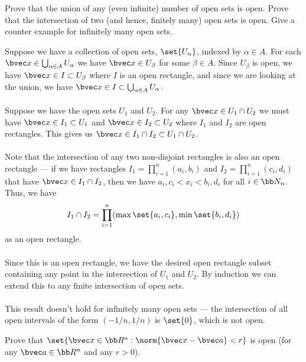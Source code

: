 \documentclass[12pt, letterpaper]{hmcpset}
\begin{document}
\pagebreak

\begin{problem}[14]
	Prove that the union of any (even infinite) number of open sets is open. Prove that the intersection of two (and hence, finitely many) open sets is open. Give a counter example for infinitely many open sets.
\end{problem}

\begin{solution}
	Suppose we have a collection of open sets, $\set{U_{\alpha}}$, indexed by $\alpha \in A$. For each $\bvec x \in \bigcup_{\alpha \in A} U_\alpha$ we have $\bvec x \in U_{\beta}$ for some $\beta \in A$. Since $U_\beta$ is open, we have $\bvec x \in I \subset U_\beta$ where $I$ is an open rectangle, and since we are looking at the union, we have $\bvec x \in I \subset \bigcup_{\alpha \in A} U_\alpha$. \\\\
	Suppose we have the open sets $U_1$ and $U_2$. For any $\bvec x \in U_1 \cap U_2$ we must have $\bvec x \in I_1 \subset U_1$ and $\bvec x \in I_2 \subset U_2$ where $I_1$ and $I_2$ are open rectangles. This gives us $\bvec x \in I_1 \cap I_2 \subset U_1 \cap U_2$. \\\\
	Note that the intersection of any two non-disjoint rectangles is also an open rectangle --- if we have rectangles $I_1 = \prod_{i = 1}^n (a_i, b_i)$ and $I_2 = \prod_{i = 1}^n (c_i, d_i)$ that have $\bvec x \in I_1 \cap I_2$, then we have $a_i, c_i < x_i < b_i, d_i$ for all $i \in \bb N_n$. Thus, we have
	\[
		I_1 \cap I_2 = \prod_{i = 1}^n (\max \set{a_i, c_i}, \min \set{b_i, d_i})
	\]
	as an open rectangle. \\\\
	Since this is an open rectangle, we have the desired open rectangle subset containing any point in the intersection of $U_1$ and $U_2$. By induction we can extend this to any finite intersection of open sets. \\\\
	This result doesn't hold for infinitely many open sets --- the intersection of all open intervals of the form $(-1/n, 1/n)$ is $\set{0}$, which is not open.
\end{solution}

\pagebreak

\begin{problem}[15]
	Prove that $\set{\bvec x \in \bb R^n : \norm{\bvec x - \bvec a} < r}$ is open (for any $\bvec a \in \bb R^n$ and any $r > 0$).
\end{problem}
\end{document}
